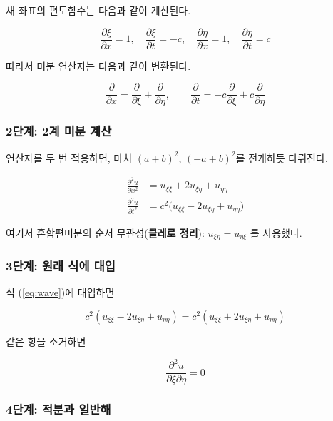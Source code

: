 \documentclass[11pt,a4paper]{article}
\begin{document}
새 좌표의 편도함수는 다음과 같이 계산된다.

\begin{equation}
\frac{\partial \xi}{\partial x} = 1, \quad \frac{\partial \xi}{\partial t} = -c, \quad \frac{\partial \eta}{\partial x} = 1, \quad \frac{\partial \eta}{\partial t} = c
\end{equation}

따라서 미분 연산자는 다음과 같이 변환된다.

\begin{equation}
\frac{\partial}{\partial x} = \frac{\partial}{\partial \xi} + \frac{\partial}{\partial \eta}, \qquad \frac{\partial}{\partial t} = -c\frac{\partial}{\partial \xi} + c\frac{\partial}{\partial \eta}
\end{equation}

\subsubsection{2단계: 2계 미분 계산}

연산자를 두 번 적용하면, 마치 $(a+b)^2$, $(-a+b)^2$를 전개하듯 다뤄진다.

\begin{align}
\frac{\partial^2 u}{\partial x^2} &= u_{\xi\xi} + 2u_{\xi\eta} + u_{\eta\eta} \\
\frac{\partial^2 u}{\partial t^2} &= c^2\bigl(u_{\xi\xi} - 2u_{\xi\eta} + u_{\eta\eta}\bigr)
\end{align}

여기서 혼합편미분의 순서 무관성(\textbf{클레로 정리}): $u_{\xi\eta} = u_{\eta\xi}$ 를 사용했다.

\subsubsection{3단계: 원래 식에 대입}

식 (\ref{eq:wave})에 대입하면

\begin{equation}
c^2(u_{\xi\xi} - 2u_{\xi\eta} + u_{\eta\eta}) = c^2(u_{\xi\xi} + 2u_{\xi\eta} + u_{\eta\eta})
\end{equation}

같은 항을 소거하면

\begin{equation}
\frac{\partial^2 u}{\partial \xi \partial \eta} = 0
\end{equation}

\subsubsection{4단계: 적분과 일반해}
\end{document}
